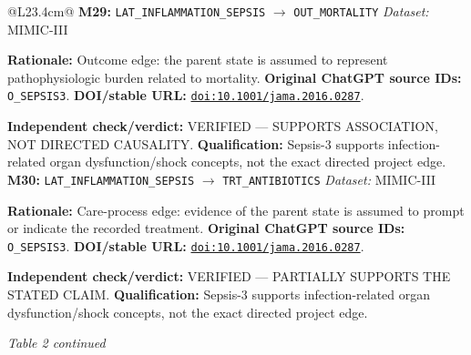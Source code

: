 \begin{tabular}{@{}L{23.4cm}@{}}
\midrule
\textbf{M29:} \nolinkurl{LAT_INFLAMMATION_SEPSIS} $\rightarrow$ \nolinkurl{OUT_MORTALITY} \hfill \textit{Dataset:} MIMIC-III\par\textbf{Rationale:} Outcome edge: the parent state is assumed to represent pathophysiologic burden related to mortality. \textbf{Original ChatGPT source IDs:} \nolinkurl{O_SEPSIS3}. \textbf{DOI/stable URL:} \href{https://doi.org/10.1001/jama.2016.0287}{\nolinkurl{doi:10.1001/jama.2016.0287}}.\par\textbf{Independent check/verdict:} VERIFIED --- SUPPORTS ASSOCIATION, NOT DIRECTED CAUSALITY. \textbf{Qualification:} Sepsis-3 supports infection-related organ dysfunction/shock concepts, not the exact directed project edge. \\
\addlinespace[2pt]
\midrule
\textbf{M30:} \nolinkurl{LAT_INFLAMMATION_SEPSIS} $\rightarrow$ \nolinkurl{TRT_ANTIBIOTICS} \hfill \textit{Dataset:} MIMIC-III\par\textbf{Rationale:} Care-process edge: evidence of the parent state is assumed to prompt or indicate the recorded treatment. \textbf{Original ChatGPT source IDs:} \nolinkurl{O_SEPSIS3}. \textbf{DOI/stable URL:} \href{https://doi.org/10.1001/jama.2016.0287}{\nolinkurl{doi:10.1001/jama.2016.0287}}.\par\textbf{Independent check/verdict:} VERIFIED --- PARTIALLY SUPPORTS THE STATED CLAIM. \textbf{Qualification:} Sepsis-3 supports infection-related organ dysfunction/shock concepts, not the exact directed project edge. \\
\addlinespace[2pt]
\midrule
\bottomrule
\end{tabular}
\clearpage
\textit{Table 2 continued}\par
